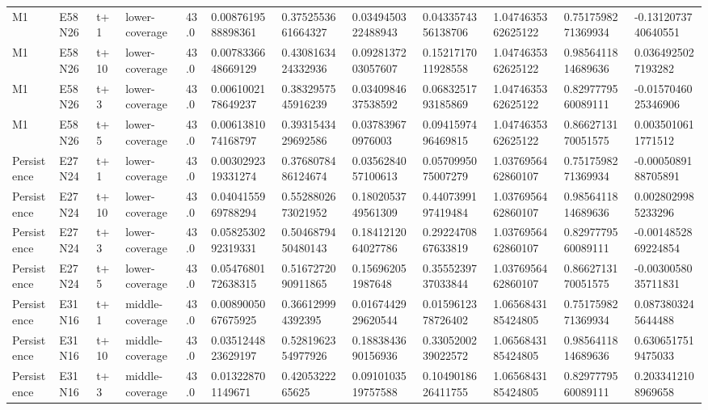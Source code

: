 \begin{landscape}
\begin{longtable}{llllllllllll}
M1 & E58N26 & t+1 & lower-coverage & 43.0 & 0.0087619588898361 & 0.3752553661664327 & 0.0349450322488943 & 0.0433574356138706 & 1.0474635362625122 & 0.7517598271369934 & -0.1312073740640551 \\
M1 & E58N26 & t+10 & lower-coverage & 43.0 & 0.0078336648669129 & 0.4308163424332936 & 0.0928137203057607 & 0.1521717011928558 & 1.0474635362625122 & 0.9856411814689636 & 0.0364925027193282 \\
M1 & E58N26 & t+3 & lower-coverage & 43.0 & 0.0061002178649237 & 0.3832957545916239 & 0.0340984637538592 & 0.0683251793185869 & 1.0474635362625122 & 0.8297779560089111 & -0.0157046025346906 \\
M1 & E58N26 & t+5 & lower-coverage & 43.0 & 0.0061381074168797 & 0.3931543429692586 & 0.037839670976003 & 0.0941597496469815 & 1.0474635362625122 & 0.8662713170051575 & 0.0035010611771512 \\
Persistence & E27N24 & t+1 & lower-coverage & 43.0 & 0.0030292319331274 & 0.3768078486124674 & 0.0356284057100613 & 0.0570995075007279 & 1.0376956462860107 & 0.7517598271369934 & -0.0005089188705891 \\
Persistence & E27N24 & t+10 & lower-coverage & 43.0 & 0.0404155969788294 & 0.5528802673021952 & 0.1802053749561309 & 0.4407399197419484 & 1.0376956462860107 & 0.9856411814689636 & 0.0028029985233296 \\
Persistence & E27N24 & t+3 & lower-coverage & 43.0 & 0.0582530292319331 & 0.5046879450480143 & 0.1841212064027786 & 0.2922470867633819 & 1.0376956462860107 & 0.8297779560089111 & -0.0014852869224854 \\
Persistence & E27N24 & t+5 & lower-coverage & 43.0 & 0.0547680172638315 & 0.5167272090911865 & 0.156962051987648 & 0.3555239737033844 & 1.0376956462860107 & 0.8662713170051575 & -0.0030058035711831 \\
Persistence & E31N16 & t+1 & middle-coverage & 43.0 & 0.0089005067675925 & 0.366129994392395 & 0.0167442929620544 & 0.0159612378726402 & 1.0656843185424805 & 0.7517598271369934 & 0.0873803245644488 \\
Persistence & E31N16 & t+10 & middle-coverage & 43.0 & 0.0351244823629197 & 0.5281962354977926 & 0.1883843690156936 & 0.3305200239022572 & 1.0656843185424805 & 0.9856411814689636 & 0.6306517519475033 \\
Persistence & E31N16 & t+3 & middle-coverage & 43.0 & 0.013228701149671 & 0.4205322265625 & 0.0910103519757588 & 0.1049018626411755 & 1.0656843185424805 & 0.8297779560089111 & 0.2033412108969658 \\

\end{longtable}
\end{landscape}
